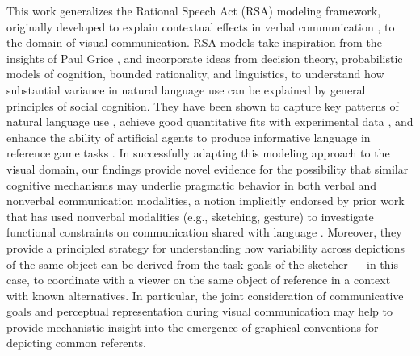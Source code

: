 \documentclass[9pt,twocolumn,twoside]{pnas-new}
\begin{document}
This work generalizes the Rational Speech Act (RSA) modeling framework, originally developed to explain contextual effects in verbal communication \cite{frank2012predicting,goodman2013knowledge,franke2016probabilistic,bergen2016pragmatic}, to the domain of visual communication.
RSA models take inspiration from the insights of Paul Grice \cite{grice1975syntax}, and incorporate ideas from decision theory, probabilistic models of cognition, bounded rationality, and linguistics, to understand how substantial variance in natural language use can be explained by general principles of social cognition. 
They have been shown to capture key patterns of natural language use \cite{goodman2013knowledge}, achieve good quantitative fits with experimental data \cite{kao2014formalizing}, and enhance the ability of artificial agents to produce informative language in reference game tasks \cite{monroe2017colors,Cohn-GordonGP18}.
In successfully adapting this modeling approach to the visual domain, our findings provide novel evidence for the possibility that similar cognitive mechanisms may underlie pragmatic behavior in both verbal and nonverbal communication modalities, a notion implicitly endorsed by prior work that has used nonverbal modalities (e.g., sketching, gesture) to investigate functional constraints on communication shared with language
\cite{goldin1977development,Garrod:2007wk,fay2010interactive,theisen2010systematicity,garrod2010can,Galantucci:2005uh,verhoef2014emergence}. %
Moreover, they provide a principled strategy for understanding how variability across depictions of the same object can be derived from the task goals of the sketcher --- in this case, to coordinate with a viewer on the same object of reference in a context with known alternatives.
In particular, the joint consideration of communicative goals and perceptual representation during visual communication may help to provide mechanistic insight into the emergence of graphical conventions for depicting common referents. 


\end{document}
